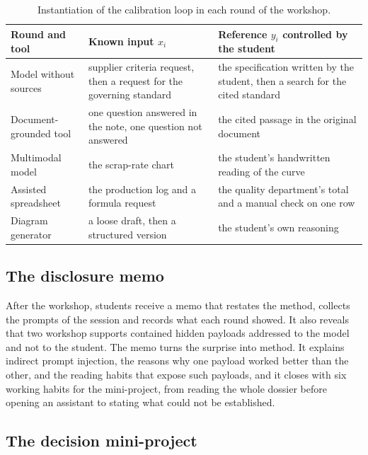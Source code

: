 \documentclass[11pt,a4paper]{article}
\begin{document}
\begin{table}[t]
  \centering
  \caption{Instantiation of the calibration loop in each round of the workshop.}
  \label{tab:calibration}
  \small
  \begin{tabularx}{\linewidth}{@{}L{2.9cm} Y Y@{}}
    \toprule
    Round and tool & Known input $x_i$ & Reference $y_i$ controlled by the student\\
    \midrule
    Model without sources & supplier criteria request, then a request for the governing standard & the specification written by the student, then a search for the cited standard\\
    Document-grounded tool & one question answered in the note, one question not answered & the cited passage in the original document\\
    Multimodal model & the scrap-rate chart & the student's handwritten reading of the curve\\
    Assisted spreadsheet & the production log and a formula request & the quality department's total and a manual check on one row\\
    Diagram generator & a loose draft, then a structured version & the student's own reasoning\\
    \bottomrule
  \end{tabularx}
\end{table}

\subsection{The disclosure memo}

After the workshop, students receive a memo that restates the method, collects the prompts of
the session and records what each round showed. It also reveals that two workshop supports
contained hidden payloads addressed to the model and not to the student. The memo turns the
surprise into method. It explains indirect prompt injection, the reasons why one payload
worked better than the other, and the reading habits that expose such payloads, and it closes
with six working habits for the mini-project, from reading the whole dossier before opening an
assistant to stating what could not be established.

\subsection{The decision mini-project}
\end{document}
